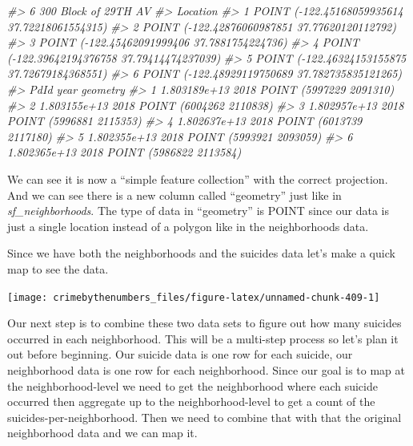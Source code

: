 \documentclass[
]{krantz}
\makeatletter
\newenvironment{Shaded}{\begin{snugshade}}{\end{snugshade}}
\newcommand{\AttributeTok}[1]{\textcolor[rgb]{0.61,0.61,0.61}{#1}}
\newcommand{\CommentTok}[1]{\textcolor[rgb]{0.37,0.37,0.37}{\textit{#1}}}
\newcommand{\ConstantTok}[1]{\textcolor[rgb]{0,0,0}{#1}}
\newcommand{\FunctionTok}[1]{\textcolor[rgb]{0,0,0}{#1}}
\newcommand{\NormalTok}[1]{#1}
\newcommand{\SpecialCharTok}[1]{\textcolor[rgb]{0,0,0}{#1}}
\newcommand{\StringTok}[1]{\textcolor[rgb]{0.5,0.5,0.5}{#1}}
\newenvironment{kframe}{%
\medskip{}
\setlength{\fboxsep}{.8em}
 \def\at@end@of@kframe{}%
 \ifinner\ifhmode%
  \def\at@end@of@kframe{\end{minipage}}%
  \begin{minipage}{\columnwidth}%
 \fi\fi%
 \def\FrameCommand##1{\hskip\@totalleftmargin \hskip-\fboxsep
 \colorbox{shadecolor}{##1}\hskip-\fboxsep
     \hskip-\linewidth \hskip-\@totalleftmargin \hskip\columnwidth}%
 \MakeFramed {\advance\hsize-\width
   \@totalleftmargin\z@ \linewidth\hsize
   \@setminipage}}%
 {\par\unskip\endMakeFramed%
 \at@end@of@kframe}
\renewenvironment{Shaded}{\begin{kframe}}{\end{kframe}}
\makeatother
\begin{document}
\begin{Shaded}
\begin{Highlighting}[]
\CommentTok{\#\textgreater{} 6    300 Block of 29TH AV}
\CommentTok{\#\textgreater{}                                         Location}
\CommentTok{\#\textgreater{} 1  POINT ({-}122.45168059935614 37.72218061554315)}
\CommentTok{\#\textgreater{} 2  POINT ({-}122.42876060987851 37.77620120112792)}
\CommentTok{\#\textgreater{} 3   POINT ({-}122.45462091999406 37.7881754224736)}
\CommentTok{\#\textgreater{} 4  POINT ({-}122.39642194376758 37.79414474237039)}
\CommentTok{\#\textgreater{} 5  POINT ({-}122.46324153155875 37.72679184368551)}
\CommentTok{\#\textgreater{} 6 POINT ({-}122.48929119750689 37.782735835121265)}
\CommentTok{\#\textgreater{}           PdId year                geometry}
\CommentTok{\#\textgreater{} 1 1.803189e+13 2018 POINT (5997229 2091310)}
\CommentTok{\#\textgreater{} 2 1.803155e+13 2018 POINT (6004262 2110838)}
\CommentTok{\#\textgreater{} 3 1.802957e+13 2018 POINT (5996881 2115353)}
\CommentTok{\#\textgreater{} 4 1.802637e+13 2018 POINT (6013739 2117180)}
\CommentTok{\#\textgreater{} 5 1.802355e+13 2018 POINT (5993921 2093059)}
\CommentTok{\#\textgreater{} 6 1.802365e+13 2018 POINT (5986822 2113584)}
\end{Highlighting}
\end{Shaded}

We can see it is now a ``simple feature collection'' with
the correct projection. And we can see there is a new column
called ``geometry'' just like in \emph{sf\_neighborhoods}.
The type of data in ``geometry'' is POINT since our data is
just a single location instead of a polygon like in the
neighborhoods data.

Since we have both the neighborhoods and the suicides data
let's make a quick map to see the data.

\begin{Shaded}
\end{Shaded}

\begin{center}\texttt{[image: crimebythenumbers\_files/figure-latex/unnamed-chunk-409-1]} \end{center}

Our next step is to combine these two data sets to figure
out how many suicides occurred in each neighborhood. This
will be a multi-step process so let's plan it out before
beginning. Our suicide data is one row for each suicide, our
neighborhood data is one row for each neighborhood. Since
our goal is to map at the neighborhood-level we need to get
the neighborhood where each suicide occurred then aggregate
up to the neighborhood-level to get a count of the
suicides-per-neighborhood. Then we need to combine that with
that the original neighborhood data and we can map it.
\end{document}
